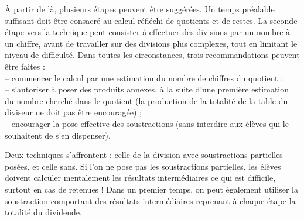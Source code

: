 À partir de là, plusieurs étapes peuvent être suggérées. Un temps préalable suffisant doit être consacré au calcul réfléchi de quotients et de restes. La seconde étape vers la technique peut consister à effectuer des divisions par un nombre à un chiffre, avant de travailler sur des divisions plus complexes, tout en limitant le niveau de difficulté. Dans toutes les circonstances, trois recommandations peuvent être faites : \\
   \hspace*{2mm} -- commencer le calcul par une estimation du nombre de chiffres du quotient ; \\
   \hspace*{2mm} -- s'autoriser à poser des produits annexes, à la suite d'une première estimation du nombre cherché dans le quotient (la production de la totalité de \og la table du diviseur \fg{} ne doit pas être encouragée) ; \\
   \hspace*{2mm} -- encourager la pose effective des soustractions (sans interdire aux élèves qui le souhaitent de s'en dispenser). \smallskip

Deux techniques s'affrontent : celle de la division avec soustractions partielles  posées, et celle sans. Si l'on ne pose pas les soustractions partielles, les élèves doivent calculer mentalement les résultats intermédiaires ce qui est difficile, surtout en cas de retenues ! Dans un premier temps, on peut également utiliser la soustraction comportant des résultats intermédiaires reprenant à chaque étape la totalité du dividende.

